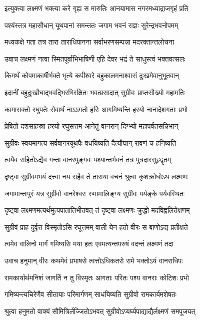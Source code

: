 \twolineshloka
{इत्युक्त्वा लक्ष्मणं भक्त्या करे गृह्य स मारुतिः}
{आनयामास नगरमध्याद्राजगृहं प्रति} %

\twolineshloka
{पश्यंस्तत्र महासौधान् यूथपानां समन्ततः}
{जगाम भवनं राज्ञः सुरेन्द्रभवनोपमम्} %

\twolineshloka
{मध्यकक्षे गता तत्र तारा ताराधिपानना}
{सर्वाभरणसम्पन्ना मदरक्तान्तलोचना} %

\twolineshloka
{उवाच लक्ष्मणं नत्वा स्मितपूर्वाभिभाषिणी}
{एहि देवर भद्रं ते साधुस्त्वं भक्तवत्सलः} %

\twolineshloka
{किमर्थं कोपमाकार्षीर्भक्ते भृत्ये कपीश्वरे}
{बहुकालमनाश्वासं दुःखमेवानुभूतवान्} %

\twolineshloka
{इदानीं बहुदुःखौघाद्भवद्भिरभिरक्षितः}
{भवत्प्रसादात् सुग्रीवः प्राप्तसौख्यो महामतिः} %

\twolineshloka
{कामासक्तो रघुपतेः सेवार्थं नाऽऽगतो हरिः}
{आगमिष्यन्ति हरयो नानादेशगताः प्रभो} %

\twolineshloka
{प्रेषितो दशसाहस्रा हरयो रघुसत्तम}
{आनेतुं वानरान् दिग्भ्यो महापर्वतसन्निभान्} %

\twolineshloka
{सुग्रीवः स्वयमागत्य सर्ववानरयूथपैः}
{वधयिष्यति दैत्यौघान् रावणं च हनिष्यति} %

\twolineshloka
{त्वयैव सहितोऽद्यैव गन्ता वानरपुङ्गवः}
{पश्यान्तर्भवनं तत्र पुत्रदारसुहृद्वृतम्} %

\twolineshloka
{दृष्ट्वा सुग्रीवमभयं दत्त्वा नय सहैव ते}
{ताराया वचनं श्रुत्वा कृशक्रोधोऽथ लक्ष्मणः} %

\twolineshloka
{जगामान्तःपुरं यत्र सुग्रीवो वानरेश्वरः}
{रुमामालिङ्ग्य सुग्रीवः पर्यङ्के पर्यवस्थितः} %

\twolineshloka
{दृष्ट्वा लक्ष्मणमत्यर्थमुत्पपातातिभीतवत्}
{तं दृष्ट्वा लक्ष्मणः क्रुद्धो मदविह्वलितेक्षणम्} %

\twolineshloka
{सुग्रीवं प्राह दुर्वृत्त विस्मृतोऽसि रघूत्तमम्}
{वाली येन हतो वीरः स बाणोऽद्य प्रतीक्षते} %

\twolineshloka
{त्वमेव वालिनो मार्गं गमिष्यसि मया हतः}
{एवमत्यन्तपरुषं वदन्तं लक्ष्मणं तदा} %

\twolineshloka
{उवाच हनुमान् वीरः कथमेवं प्रभाषसे}
{त्वत्तोऽधिकतरो रामे भक्तोऽयं वानराधिपः} %

\twolineshloka
{रामकार्यार्थमनिशं जागर्ति न तु विस्मृतः}
{आगताः परितः पश्य वानराः कोटिशः प्रभो} %

\twolineshloka
{गमिष्यन्त्यचिरेणैव सीतायाः परिमार्गणम्}
{साधयिष्यति सुग्रीवो रामकार्यमशेषतः} %

\twolineshloka
{श्रुत्वा हनुमतो वाक्यं सौमित्रिर्लज्जितोऽभवत्}
{सुग्रीवोऽप्यर्घ्यपाद्याद्यैर्लक्ष्मणं समपूजयत्} %

